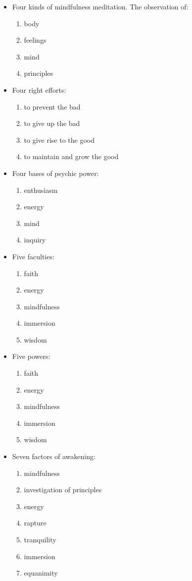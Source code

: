 \documentclass[12pt,openany]{book}%
\begin{document}
\begin{itemize}%
\item Four kinds of mindfulness meditation. The observation of:
\begin{enumerate}%
\item body%
\item feelings%
\item mind%
\item principles%
\end{enumerate}

%
\item Four right efforts:
\begin{enumerate}%
\item to prevent the bad%
\item to give up the bad%
\item to give rise to the good%
\item to maintain and grow the good%
\end{enumerate}

%
\item Four bases of psychic power:
\begin{enumerate}%
\item enthusiasm%
\item energy%
\item mind%
\item inquiry%
\end{enumerate}

%
\item Five faculties:
\begin{enumerate}%
\item faith%
\item energy%
\item mindfulness%
\item immersion%
\item wisdom%
\end{enumerate}

%
\item Five powers:
\begin{enumerate}%
\item faith%
\item energy%
\item mindfulness%
\item immersion%
\item wisdom%
\end{enumerate}

%
\item Seven factors of awakening:
\begin{enumerate}%
\item mindfulness%
\item investigation of principles%
\item energy%
\item rapture%
\item tranquility%
\item immersion%
\item equanimity%
\end{enumerate}


\end{itemize}
\end{document}
